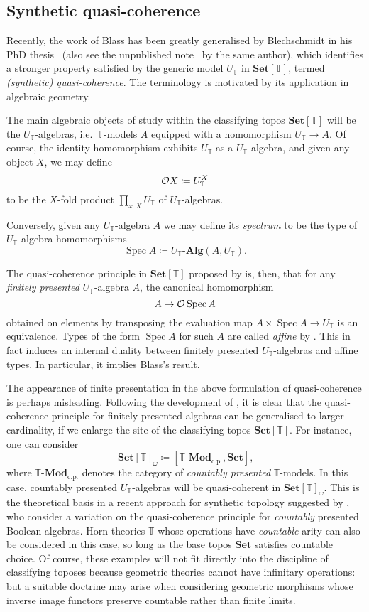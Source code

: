 \documentclass[a4paper,12pt]{amsart}
\theoremstyle{definition}
\newcommand{\mb}[1]{\mathbf{#1}}
\newcommand{\mbb}[1]{\mathbb{#1}}
\newcommand{\T}{\mbb T}
\newcommand{\mr}[1]{\mathrm{#1}}
\newcommand{\Set}{\mb{Set}}
\newcommand{\alg}{\text{-}\mb{Alg}}
\newcommand{\cp}{_{\mr{c.p.}}}
\newcommand{\mmod}[1]{#1\text{-}\mathbf{Mod}}
\newcommand{\spec}{\operatorname{Spec}}
\begin{document}
\subsection{Synthetic quasi-coherence}\label{subsec:qc}

Recently, the work of Blass has been greatly generalised by Blechschmidt in his PhD thesis~\citep{blechschmidt2021using} (also see the unpublished note~\citep{blechschmidt2020general} by the same author), which identifies a stronger property satisfied by the generic model $U_\T$ in $\Set[\T]$, termed \emph{(synthetic) quasi-coherence}. The terminology is motivated by its application in algebraic geometry.

The main algebraic objects of study within the classifying topos $\Set[\T]$ will be the $U_\T$-algebras, i.e.\ $\T$-models $A$ equipped with a homomorphism $U_\T\to A$. Of course, the identity homomorphism exhibits $U_\T$ as a $U_\T$-algebra, and given any object $X$, we may define \[\opens X\coloneq U_\T^X\] to be the $X$-fold product $\prod_{x:X}U_\T$ of $U_\T$-algebras. 

Conversely, given any $U_\T$-algebra $A$ we may define its \emph{spectrum} to be the type of $U_\T$-algebra homomorphisms 
\[ \spec A \coloneq U_\T\alg(A,U_\T)\text{.}\]

The quasi-coherence principle in $\Set[\T]$ proposed by \citet{blechschmidt2021using} is, then, that for any \emph{finitely presented} $U_\T$-algebra $A$, the canonical homomorphism
\[
  A\to \opens\spec A
\]
obtained on elements by transposing the evaluation map $A\times \spec A\to U_\T$ is an equivalence.
Types of the form $\spec A$ for such $A$ are called \emph{affine} by \citet{blechschmidt2021using}. This in fact induces an internal duality between finitely presented $U_\T$-algebras and affine types. In particular, it implies Blass's result. 

The appearance of finite presentation in the above formulation of quasi-coherence is perhaps misleading. Following the development of \citet{blechschmidt2021using,blechschmidt2020general}, it is clear that the quasi-coherence principle for finitely presented algebras can be generalised to larger cardinality,
if we enlarge the site of the classifying topos $\Set[\T]$. For instance, one can consider
\[ \Set[\T]_\omega \coloneq [\mmod\T\cp,\Set]\text{,} \]
where $\mmod\T\cp$ denotes the category of \emph{countably presented} $\T$-models. In this case, countably presented $U_\T$-algebras will be quasi-coherent in $\Set[\T]_\omega$. This is the theoretical basis in a recent approach for synthetic topology suggested by \citet{cherubini2024foundation}, who consider a variation on the quasi-coherence principle for \emph{countably} presented Boolean algebras. 
%
Horn theories $\T$ whose operations have \emph{countable} arity can also be considered in this case, so long as the base topos $\Set$ satisfies countable choice. Of course, these examples will not fit directly into the discipline of classifying toposes because geometric theories cannot have infinitary operations: but a suitable doctrine may arise when considering geometric morphisms whose inverse image functors preserve countable rather than finite limits.
\end{document}
